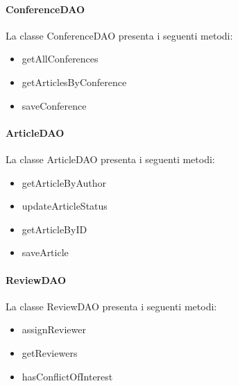 \paragraph{ConferenceDAO}
La classe ConferenceDAO presenta i seguenti metodi:
\begin{itemize}
\item getAllConferences
\item getArticlesByConference
\item saveConference
\end{itemize}

\paragraph{ArticleDAO}
La classe ArticleDAO presenta i seguenti metodi:
\begin{itemize}
\item getArticleByAuthor
\item updateArticleStatus
\item getArticleByID
\item saveArticle
\end{itemize}

\paragraph{ReviewDAO}
La classe ReviewDAO presenta i seguenti metodi:
\begin{itemize}
\item assignReviewer
\item getReviewers
\item hasConflictOfInterest
\end{itemize}

